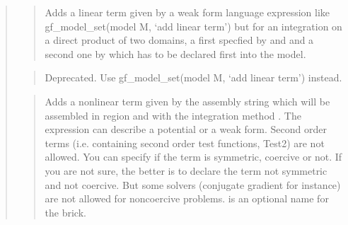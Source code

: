 \documentclass[a4paper,11pt,english]{sphinxmanual}
\begin{document}
\begin{quote}
\sphinxAtStartPar
{}
\begin{quote}

\sphinxAtStartPar
Adds a linear term given by a weak form language expression like
gf\_model\_set(model M, ‘add linear term’) but for an integration on a direct
product of two domains, a first specfied by  and 
and a second one by  which has to be declared
first into the model.
\end{quote}

\sphinxAtStartPar
{}
\begin{quote}

\sphinxAtStartPar
Deprecated. Use gf\_model\_set(model M, ‘add linear term’) instead.
\end{quote}

\sphinxAtStartPar
{}
\begin{quote}

\sphinxAtStartPar
Adds a nonlinear term given by the assembly string  which will
be assembled in region  and with the integration method .
The expression can describe a potential or a weak form. Second order
terms (i.e. containing second order test functions, Test2) are not
allowed.
You can specify if the term is symmetric, coercive or not.
If you are not sure, the better is to declare the term not symmetric
and not coercive. But some solvers (conjugate gradient for instance)
are not allowed for non\sphinxhyphen{}coercive problems.
 is an optional name for the brick.
\end{quote}

\sphinxAtStartPar
{}
\begin{quote}


\end{quote}
\end{quote}
\end{document}
